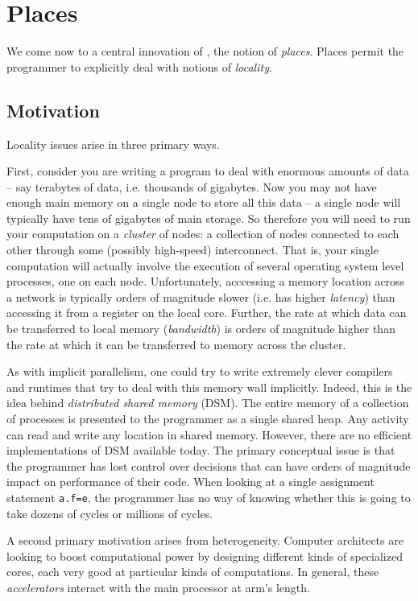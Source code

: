 \section{Places}\label{sec:places}
We come now to a central innovation of \Xten, the notion of {\em
places}. Places permit the programmer to explicitly deal with notions
of {\em locality}.

\subsection{Motivation}
Locality issues arise in three primary ways. 

First, consider you are writing a program to deal with enormous
amounts of data -- say terabytes of data, i.e. thousands of
gigabytes. Now you may not have enough main memory on a single node to
store all this data -- a single node will typically have tens of
gigabytes of main storage. So therefore you will need to run your
computation on a {\em cluster} of nodes: a collection of nodes
connected to each other through some (possibly high-speed)
interconnect.  That is, your single computation will actually involve
the execution of several operating system level processes, one on each
node. Unfortunately, acccessing a memory location across a network is
typically orders of magnitude slower (i.e. has higher {\em latency})
than accessing it from a register on the local core. Further, the rate
at which data can be transferred to local memory ({\em bandwidth}) is
orders of magnitude higher than the rate at which it can be
transferred to memory across the cluster.

As with implicit parallelism, one could try to write extremely clever
compilers and runtimes that try to deal with this memory wall
implicitly. Indeed, this is the idea behind {\em distributed shared
memory} (DSM). The entire memory of a collection of processes is
presented to the programmer as a single shared heap. Any activity can
read and write any location in shared memory. However, there are no
efficient implementations of DSM available today. The primary
conceptual issue is that the programmer has lost control over
decisions that can have orders of magnitude impact on performance of
their code. When looking at a single assignment statement {\tt a.f=e},
the programmer has no way of knowing whether this is going to take
dozens of cycles or millions of cycles.

A second primary motivation arises from heterogeneity. Computer
architects are looking to boost computational power by designing
different kinds of specialized cores, each very good at particular
kinds of computations. In general, these {\em accelerators} interact
with the main processor at arm's length.

